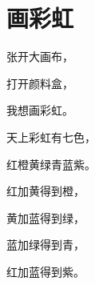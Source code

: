 \documentclass[12pt,UTF-8,openany]{ctexbook}
\begin{document}
\clearpage

\begin{center}
    
\end{center}


\hanzibox{}\hanzibox{}\hanzibox{}\hanzibox{}\hspace{1em}\hanzibox{}\hanzibox{}\hanzibox{}\hanzibox{}

\hanzibox{}\hanzibox{}\hanzibox{}\hanzibox{}\hspace{1em}\hanzibox{}\hanzibox{}\hanzibox{}\hanzibox{}

\hanzibox{}\hanzibox{}\hanzibox{}\hanzibox{}\hspace{1em}\hanzibox{}\hanzibox{}\hanzibox{}\hanzibox{}






\chapter{画彩虹}

\begin{large}
    
    张开大画布，
    
    打开颜料盒，
    
    我想画彩虹。
    
    天上彩虹有七色，
    
    红橙黄绿青蓝紫。
    
    红加黄得到橙，
    
    黄加蓝得到绿，
    
    蓝加绿得到青，
    
    红加蓝得到紫。
    
\end{large}


\clearpage

\begin{center}
    
\end{center}


\hanzibox{}\hanzibox{}\hanzibox{}\hanzibox{}\hspace{1em}\hanzibox{}\hanzibox{}\hanzibox{}\hanzibox{}
\end{document}
